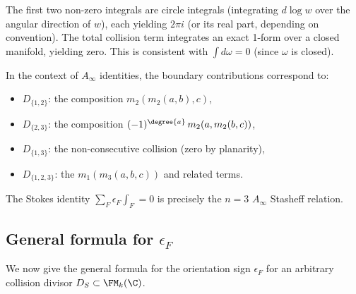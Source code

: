 The first two non-zero integrals are circle integrals (integrating $d\log w$ over the angular direction of $w$), each yielding $2\pi i$ (or its real part, depending on convention). The total collision term integrates an exact 1-form over a closed manifold, yielding zero. This is consistent with $\int d\omega = 0$ (since $\omega$ is closed).

\begin{remark}
In the context of $A_\infty$ identities, the boundary contributions correspond to:
\begin{itemize}
\item $D_{\{1,2\}}$: the composition $m_2(m_2(a,b),c)$,
\item $D_{\{2,3\}}$: the composition $(-1)^{\degree{a}}\,m_2(a,m_2(b,c))$,
\item $D_{\{1,3\}}$: the non-consecutive collision (zero by planarity),
\item $D_{\{1,2,3\}}$: the $m_1(m_3(a,b,c))$ and related terms.
\end{itemize}
The Stokes identity $\sum_F \epsilon_F \int_F = 0$ is precisely the $n=3$ $A_\infty$ Stasheff relation.
\end{remark}

\subsection{General formula for $\epsilon_F$}
\label{subsec:general-eps}

We now give the general formula for the orientation sign $\epsilon_F$ for an arbitrary collision divisor $D_S \subset \FM_k(\C)$.

